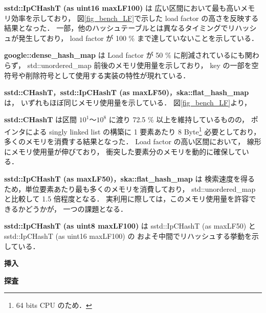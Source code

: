 {\bf sstd::IpCHashT (as uint16 maxLF100)} は
広い区間において最も高いメモリ効率を示しており，
図\ref{fig_bench_LF}で示した load factor の高さを反映する結果となった．
一部，他のハッシュテーブルとは異なるタイミングでリハッシュが発生しており，
load factor が 100 \% まで達していないことを示している．

{\bf google::dense\_hash\_map} は
Load factor が 50 \% に削減されているにも関わらず，
std::unordered\_map 前後のメモリ使用量を示しており，
key の一部を空符号や削除符号として使用する実装の特性が現れている．

{\bf sstd::CHashT}，{\bf sstd::IpCHashT (as maxLF50)}，{\bf ska::flat\_hash\_map} は，
いずれもほぼ同じメモリ使用量を示している．
図\ref{fig_bench_LF}より，

{\bf sstd::CHashT} は区間 $10^1〜10^8$ に渡り 72.5 \% 以上を維持しているものの，
ポインタによる singly linked list の構築に 1 要素あたり 8 Byte\footnote{64 bits CPU のため．} 必要としており，
多くのメモリを消費する結果となった．
Load factor の高い区間において，
線形にメモリ使用量が伸びており，
衝突した要素分のメモリを動的に確保している．

{\bf sstd::IpCHashT (as maxLF50)}，{\bf ska::flat\_hash\_map} は
検索速度を得るため，単位要素あたり最も多くのメモリを消費しており，
std::unordered\_map と比較して 1.5 倍程度となる．
実利用に際しては，このメモリ使用量を許容できるかどうかが，
一つの課題となる．

{\bf sstd::IpCHashT (as uint8 maxLF100)} は
sstd::IpCHashT (as maxLF50) と sstd::IpCHashT (as uint16 maxLF100) の
およそ中間でリハッシュする挙動を示している．
\leavevmode \newline

%
{\bf 挿入}
\samepage\newline\indent
\leavevmode \newline

%
{\bf 探査}
\samepage\newline\indent
\leavevmode \newline

